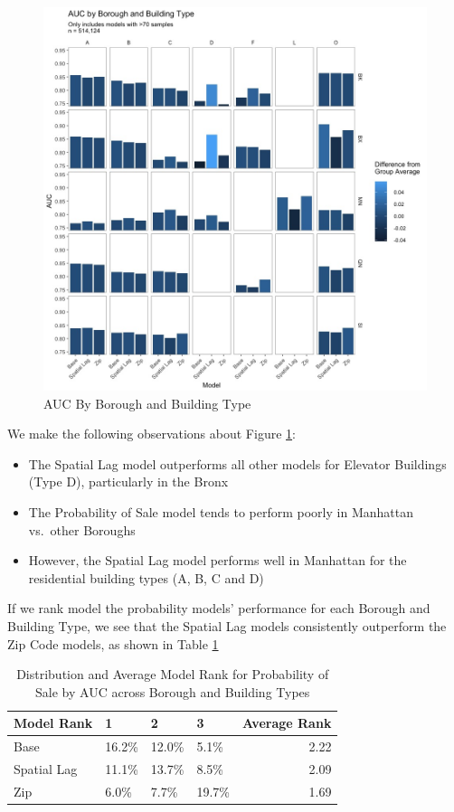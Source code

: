\documentclass[12pt,]{article}
\providecommand{\tightlist}{%
  \setlength{\itemsep}{0pt}\setlength{\parskip}{0pt}}
\begin{document}
\begin{figure}[h]
\includegraphics[width=1\linewidth]{Sections/tables and figures/AUC by boro and build type} \caption{AUC By Borough and Building Type}\label{fig:AUC by boro and build type}
\end{figure}

We make the following observations about Figure
\ref{fig:AUC by boro and build type}:

\begin{itemize}
\tightlist
\item
  The Spatial Lag model outperforms all other models for Elevator
  Buildings (Type D), particularly in the Bronx
\item
  The Probability of Sale model tends to perform poorly in Manhattan
  vs.~other Boroughs
\item
  However, the Spatial Lag model performs well in Manhattan for the
  residential building types (A, B, C and D)
\end{itemize}

If we rank model the probability models' performance for each Borough
and Building Type, we see that the Spatial Lag models consistently
outperform the Zip Code models, as shown in Table
\ref{tab:ProbModelAUCRank}

\begin{table}

\caption{\label{tab:Prob Model AUC Average Rank}\label{tab:ProbModelAUCRank} Distribution and Average Model Rank for Probability of Sale by AUC across Borough and Building Types}
\centering
\begin{tabular}[t]{llllr}
\toprule
Model Rank & 1 & 2 & 3 & Average Rank\\
\midrule
Base & 16.2\% & 12.0\% & 5.1\% & 2.22\\
Spatial Lag & 11.1\% & 13.7\% & 8.5\% & 2.09\\
Zip & 6.0\% & 7.7\% & 19.7\% & 1.69\\
\bottomrule
\end{tabular}
\end{table}
\end{document}
